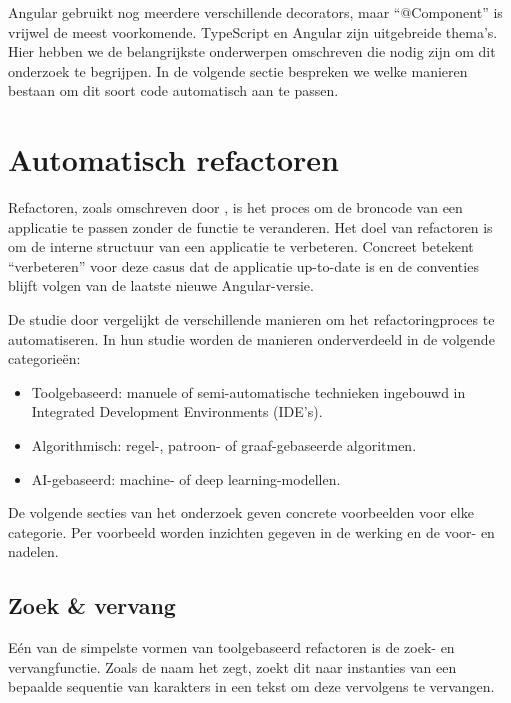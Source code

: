 Angular gebruikt nog meerdere verschillende decorators, maar ``@Component'' is vrijwel de meest voorkomende.
TypeScript en Angular zijn uitgebreide thema's.
Hier hebben we de belangrijkste onderwerpen omschreven die nodig zijn om dit onderzoek te begrijpen.
In de volgende sectie bespreken we welke manieren bestaan om dit soort code automatisch aan te passen.

\section{Automatisch refactoren}
\label{ch:stand-van-zaken:refactoring}

Refactoren, zoals omschreven door \textcite{Kaur2016}, is het proces om de broncode van een applicatie te passen zonder de functie te veranderen.
Het doel van refactoren is om de interne structuur van een applicatie te verbeteren.
Concreet betekent ``verbeteren'' voor deze casus dat de applicatie up-to-date is en de conventies blijft volgen van de laatste nieuwe Angular-versie.

De studie door \textcite{Hodovychenko2025} vergelijkt de verschillende manieren om het refactoringproces te automatiseren.
In hun studie worden de manieren onderverdeeld in de volgende categorieën:
\begin{itemize}
  \item Toolgebaseerd: manuele of semi-automatische technieken ingebouwd in Integrated Development Environments (IDE's).
  \item Algorithmisch: regel-, patroon- of graaf-gebaseerde algoritmen.
  \item AI-gebaseerd: machine- of deep learning-modellen.
\end{itemize}
De volgende secties van het onderzoek geven concrete voorbeelden voor elke categorie.
Per voorbeeld worden inzichten gegeven in de werking en de voor- en nadelen.

\subsection{Zoek \& vervang}
\label{ch:stand-van-zaken:refactoring:find-and-replace}

Eén van de simpelste vormen van toolgebaseerd refactoren is de zoek- en vervangfunctie.
Zoals de naam het zegt, zoekt dit naar instanties van een bepaalde sequentie van karakters in een tekst om deze vervolgens te vervangen.

